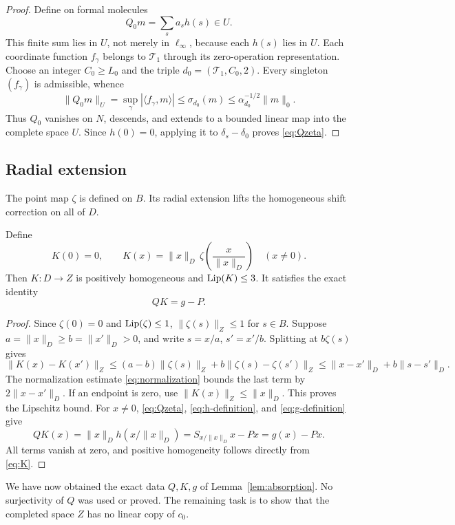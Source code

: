 \begin{proof}
Define on formal molecules
\[
                  Q_0m=\sum_s a_s h(s)\in U.
\]
This finite sum lies in \(U\), not merely in \(\ell_\infty\), because
each \(h(s)\) lies in \(U\). Each coordinate function \(f_\gamma\)
belongs to \(\mathcal T_1\) through its zero-operation representation.
Choose an integer \(C_0\geq L_0\) and the triple
\(d_0=(\mathcal T_1,C_0,2)\). Every singleton \((f_\gamma)\) is
admissible, whence
\[
 \|Q_0m\|_U=\sup_\gamma|\langle f_\gamma,m\rangle|
 \leq\sigma_{d_0}(m)\leq\alpha_{d_0}^{-1/2}\|m\|_0.
\]
Thus \(Q_0\) vanishes on \(N\), descends, and extends to a bounded
linear map into the complete space \(U\). Since \(h(0)=0\), applying
it to \(\delta_s-\delta_0\) proves \eqref{eq:Qzeta}.
\end{proof}

\subsection{Radial extension}

The point map \(\zeta\) is defined on \(B\). Its radial extension
lifts the homogeneous shift correction on all of \(D\).

\begin{lemma}\label{lem:K}
Define
\begin{equation}
 K(0)=0,\qquad
 K(x)=\|x\|_D\,\zeta\!\left(\frac{x}{\|x\|_D}\right)
                         \quad(x\ne0).                       \label{eq:K}
\end{equation}
Then \(K:D\to Z\) is positively homogeneous and
\(\operatorname{Lip}(K)\leq3\). It satisfies the exact identity
\begin{equation}
                              QK=g-P.                        \label{eq:lift}
\end{equation}
\end{lemma}

\begin{proof}
Since \(\zeta(0)=0\) and \(\operatorname{Lip}(\zeta)\leq1\),
\(\|\zeta(s)\|_Z\leq1\) for \(s\in B\). Suppose
\(a=\|x\|_D\geq b=\|x'\|_D>0\), and write \(s=x/a\), \(s'=x'/b\).
Splitting at \(b\zeta(s)\) gives
\[
 \|K(x)-K(x')\|_Z
 \leq(a-b)\|\zeta(s)\|_Z+b\|\zeta(s)-\zeta(s')\|_Z
 \leq\|x-x'\|_D+b\|s-s'\|_D.
\]
The normalization estimate \eqref{eq:normalization} bounds the last term by
\(2\|x-x'\|_D\). If an endpoint is zero, use
\(\|K(x)\|_Z\leq\|x\|_D\). This proves the Lipschitz bound.
For \(x\ne0\), \eqref{eq:Qzeta}, \eqref{eq:h-definition}, and \eqref{eq:g-definition} give
\[
 QK(x)=\|x\|_D h(x/\|x\|_D)
      =S_{x/\|x\|_D}x-Px=g(x)-Px.
\]
All terms vanish at zero, and positive homogeneity follows directly
from \eqref{eq:K}.
\end{proof}

We have now obtained the exact data \(Q,K,g\) of
Lemma~\ref{lem:absorption}. No surjectivity of \(Q\) was used or
proved. The remaining task is to show that the completed space \(Z\)
has no linear copy of \(c_0\).
